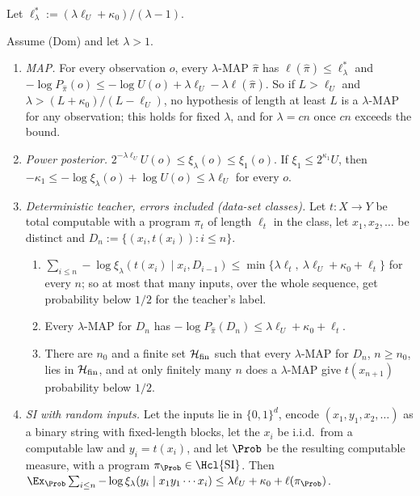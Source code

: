Let $\ell^*_\lambda:=(\lambda\ell_U+\kappa_0)/(\lambda-1)$.

\begin{theorem}[Absorption]\label{thm:absorb:absorption}
Assume (Dom) and let $\lambda>1$.
\begin{enumerate}[label=(\alph*)]
\item \emph{MAP.} For every observation $o$, every $\lambda$-MAP $\hat\pi$ has $\ell(\hat\pi)\le\ell^*_\lambda$ and $-\log P_{\hat\pi}(o)\le-\log U(o)+\lambda\ell_U-\lambda\ell(\hat\pi)$. So if $L>\ell_U$ and $\lambda>(L+\kappa_0)/(L-\ell_U)$, no hypothesis of length at least $L$ is a $\lambda$-MAP for any observation; this holds for fixed $\lambda$, and for $\lambda=cn$ once $cn$ exceeds the bound.
\item \emph{Power posterior.} $2^{-\lambda\ell_U}U(o)\le\xi_\lambda(o)\le\xi_1(o)$. If $\xi_1\le2^{\kappa_1}U$, then $-\kappa_1\le-\log\xi_\lambda(o)+\log U(o)\le\lambda\ell_U$ for every $o$.
\item \emph{Deterministic teacher, errors included (data-set classes).} Let $t:X\to Y$ be total computable with a program $\pi_t$ of length $\ell_t$ in the class, let $x_1,x_2,\dots$ be distinct and $D_n:=\{(x_i,t(x_i)):i\le n\}$.
\begin{enumerate}[label=(c\arabic*)]
\item $\sum_{i\le n}-\log\xi_\lambda(t(x_i)\mid x_i,D_{i-1})\le\min\{\lambda\ell_t,\ \lambda\ell_U+\kappa_0+\ell_t\}$ for every $n$; so at most that many inputs, over the whole sequence, get probability below $1/2$ for the teacher's label.
\item Every $\lambda$-MAP for $D_n$ has $-\log P_{\hat\pi}(D_n)\le\lambda\ell_U+\kappa_0+\ell_t$.
\item There are $n_0$ and a finite set $\mathcal H_{\rm fin}$ such that every $\lambda$-MAP for $D_n$, $n\ge n_0$, lies in $\mathcal H_{\rm fin}$, and at only finitely many $n$ does a $\lambda$-MAP give $t(x_{n+1})$ probability below $1/2$.
\end{enumerate}
\item \emph{SI with random inputs.} Let the inputs lie in $\{0,1\}^d$, encode $(x_1,y_1,x_2,\dots)$ as a binary string with fixed-length blocks, let the $x_i$ be i.i.d.\ from a computable law and $y_i=t(x_i)$, and let $\Prob$ be the resulting computable measure, with a program $\pi_{\Prob}\in\Hcl{\mathrm{SI}}$. Then $\Ex_{\Prob}\sum_{i\le n}-\log\xi_\lambda(y_i\mid x_1y_1\cdots x_i)\le\lambda\ell_U+\kappa_0+\ell(\pi_{\Prob})$.
\end{enumerate}
\end{theorem}

